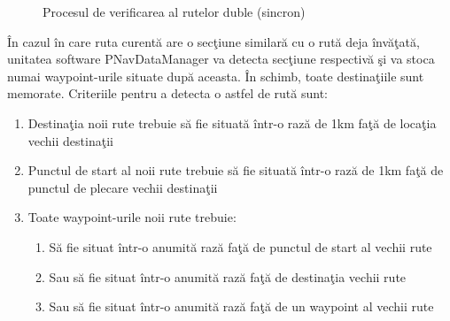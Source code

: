 	\begin{figure}[h!]
   \centering
   \caption{Procesul de verificarea al rutelor duble (sincron)}
   \end{figure}	
	
	În cazul în care ruta curentă are o secţiune similară cu o rută deja învăţată, unitatea software PNavDataManager va detecta secţiune respectivă şi va stoca numai waypoint-urile situate după aceasta. În schimb, toate destinaţiile sunt memorate. Criteriile pentru a detecta o astfel de rută sunt:
	
		\begin{enumerate}
	 \setlength\itemsep{0em}
		\item Destinaţia noii rute trebuie să fie situată într-o rază de 1km faţă de locaţia vechii destinaţii
		\item Punctul de start al noii rute trebuie să fie situată într-o rază de 1km faţă de punctul de plecare vechii destinaţii
		\item Toate waypoint-urile noii rute trebuie:
				\begin{enumerate}
				 \setlength\itemsep{0em}
					\item Să fie situat într-o anumită rază faţă de punctul de start al vechii rute
					\item Sau să fie situat într-o anumită rază faţă de destinaţia vechii rute
					\item Sau să fie situat într-o anumită rază faţă de un waypoint al vechii rute
				\end{enumerate}
	\end{enumerate}

